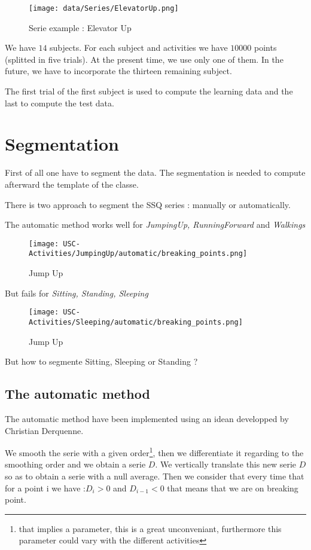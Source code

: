 \documentclass[a4,12pt]{article}
\begin{document}
	\begin{figure}[H]
		\centering
		\texttt{[image: data/Series/ElevatorUp.png]}
		\caption{Serie example : Elevator Up}
		\label{ElevatorUp}
	\end{figure}
	
	We have $14$ subjects. For each subject and activities we have $10000$ points (splitted in five trials). At the present time, we use only one of them. In the future, we have to incorporate the thirteen remaining subject.
	
	The first trial of the first subject is used to compute the learning data and the last to compute the test data.
	
	\section{Segmentation}
	
	First of all one have to segment the data. The segmentation is needed to compute afterward the template of the classe.
	
	There is two approach to segment the SSQ series : manually or automatically.
	
	The automatic method works well for \textit{JumpingUp, RunningForward} and \textit{Walkings}
	
	\begin{figure}[H]
		\centering
		\texttt{[image: USC-Activities/JumpingUp/automatic/breaking\_points.png]}
		\caption{Jump Up}
		\label{JumpUp}
	\end{figure}
	
	But fails for \textit{Sitting, Standing, Sleeping}
	
	\begin{figure}[H]
		\centering
		\texttt{[image: USC-Activities/Sleeping/automatic/breaking\_points.png]}
		\caption{Jump Up}
		\label{JumpUp}
	\end{figure}
	
	But how to segmente Sitting, Sleeping or Standing ? 
	
	\subsection{The automatic method}
		
		The automatic method have been implemented using an idean developped by Christian Derquenne\cite{derquenne}. 
		
		We smooth the serie with a given order\footnote{that implies a parameter, this is a great unconveniant, furthermore this parameter could vary with the different activities}, then we differentiate it regarding to the smoothing order and we obtain a serie $D$. We vertically translate this new serie $D$ so as to obtain a serie with a null average. Then we consider that every time that for a point i we have :$D_{i}>0$ and $D_{i-1}<0$ that means that we are on breaking point.
		
\end{document}

